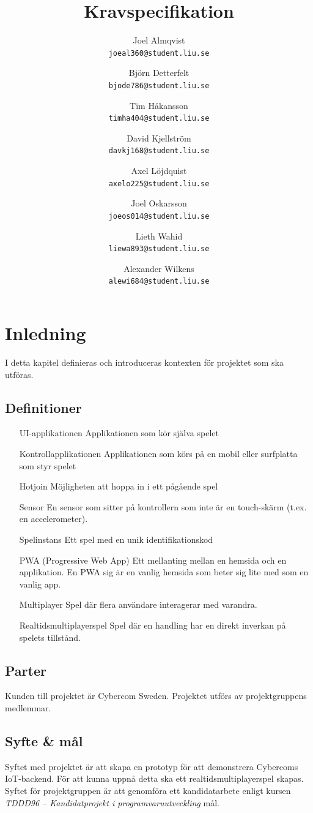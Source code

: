 \documentclass[10pt]{article}
\title{Kravspecifikation}
\author{
    Joel Almqvist\\
    \texttt{joeal360@student.liu.se}
    \and
    Björn Detterfelt\\
    \texttt{bjode786@student.liu.se}
    \and
    Tim Håkansson\\
    \texttt{timha404@student.liu.se}
    \and
    David Kjellström\\
    \texttt{davkj168@student.liu.se}
    \and
    Axel Löjdquist\\
    \texttt{axelo225@student.liu.se}
    \and
    Joel Oskarsson\\
    \texttt{joeos014@student.liu.se}
    \and
    Lieth Wahid\\
    \texttt{liewa893@student.liu.se}
    \and
    Alexander Wilkens\\
    \texttt{alewi684@student.liu.se}
}
\begin{document}
\maketitle
\pagebreak
\tableofcontents
\pagebreak
\section{Inledning}
	I detta kapitel definieras och introduceras kontexten för projektet som ska utföras.

	\subsection{Definitioner}
		\begin{itemize}[leftmargin=4cm]
		\item [UI-applikationen] Applikationen som kör själva spelet
		\item [Kontrollapplikationen] Applikationen som körs på en mobil eller surfplatta som styr spelet
		\item [Hotjoin] Möjligheten att hoppa in i ett pågående spel
		\item [Sensor] En sensor som sitter på kontrollern som inte är en touch-skärm (t.ex. en accelerometer).
		\item [Spelinstans] Ett spel med en unik identifikationskod
		\item [PWA (Progressive Web App)] Ett mellanting mellan en hemsida och en applikation. En PWA sig är en vanlig hemsida som beter sig lite med som en vanlig app.
        \item [Multiplayer] Spel där flera användare interagerar med varandra.
		\item [Realtidsmultiplayerspel] Spel där en handling har en direkt inverkan på spelets tillstånd.
		\end{itemize}	

	\subsection{Parter}
	Kunden till projektet är Cybercom Sweden. Projektet utförs av projektgruppens medlemmar.
	
	\subsection{Syfte \& mål}
		Syftet med projektet är att skapa en prototyp för att demonstrera Cybercoms IoT-backend. För att kunna uppnå detta ska ett realtidsmultiplayerspel skapas. Syftet för projektgruppen är att genomföra ett kandidatarbete enligt kursen \textit{TDDD96 -- Kandidatprojekt i programvaruutveckling} mål\cite{bib-tddd96}.
	
\end{document}
